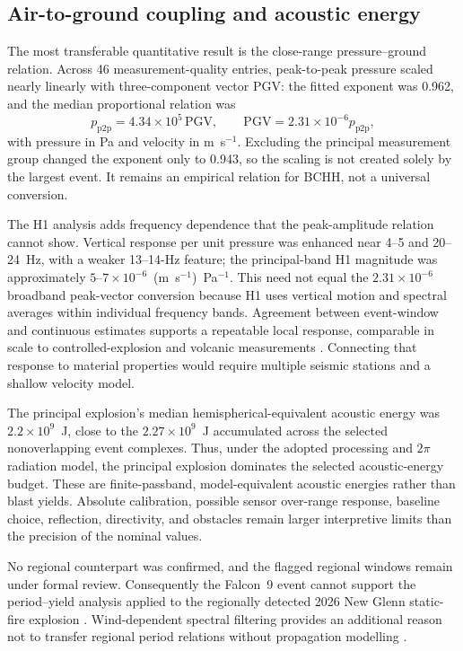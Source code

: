 \documentclass[]{seismica}
\begin{document}
\subsection{Air-to-ground coupling and acoustic energy}

The most transferable quantitative result is the close-range pressure--ground
relation. Across 46 measurement-quality entries, peak-to-peak pressure scaled
nearly linearly with three-component vector PGV: the fitted exponent was 0.962,
and the median proportional relation was
\[
 p_{\mathrm{p2p}}=4.34\times10^5\,\mathrm{PGV},
 \qquad
 \mathrm{PGV}=2.31\times10^{-6}p_{\mathrm{p2p}},
\]
with pressure in Pa and velocity in m~s$^{-1}$. Excluding the principal
measurement group changed the exponent only to 0.943, so the scaling is not
created solely by the largest event. It remains an empirical relation for BCHH,
not a universal conversion.

The H1 analysis adds frequency dependence that the peak-amplitude relation
cannot show. Vertical response per unit pressure was enhanced near 4--5 and
20--24~Hz, with a weaker 13--14-Hz feature; the principal-band H1 magnitude was
approximately $5$--$7\times10^{-6}$~(m~s$^{-1}$)~Pa$^{-1}$. This need not equal
the $2.31\times10^{-6}$ broadband peak-vector conversion because H1 uses
vertical motion and spectral averages within individual frequency bands.
Agreement between event-window and continuous estimates supports a repeatable
local response, comparable in scale to controlled-explosion and volcanic
measurements \citep{novoselov_ground_coupling_2020}. Connecting that response
to material properties would require multiple seismic stations and a shallow
velocity model.

The principal explosion's median hemispherical-equivalent acoustic energy was
$2.2\times10^9$~J, close to the $2.27\times10^9$~J accumulated across the
selected nonoverlapping event complexes. Thus, under the adopted processing and
$2\pi$ radiation model, the principal explosion dominates the selected
acoustic-energy budget. These are finite-passband, model-equivalent acoustic
energies rather than blast yields. Absolute calibration, possible sensor
over-range response, baseline choice, reflection, directivity, and obstacles
remain larger interpretive limits than the precision of the nominal values.

No regional counterpart was confirmed, and the flagged regional windows remain
under formal review. Consequently the Falcon~9 event cannot support the
period--yield analysis applied to the regionally detected 2026 New Glenn
static-fire explosion \citep{silber_scamfer_newglenn_2026}. Wind-dependent
spectral filtering provides an additional reason not to transfer regional
period relations without propagation modelling
\citep{silber_wind_filtering_2026}.
\end{document}
